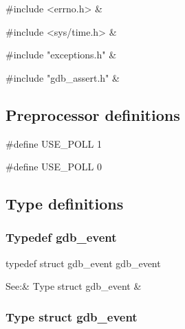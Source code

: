 \medskip
\begin{cxreftabi}
{\stt \#include <errno.h>} &\\
\end{cxreftabi}

\medskip
\begin{cxreftabi}
{\stt \#include <sys/time.h>} &\\
\end{cxreftabi}

\medskip
\begin{cxreftabi}
{\stt \#include "exceptions.h"} &\\
\end{cxreftabi}

\medskip
\begin{cxreftabi}
{\stt \#include "gdb\_assert.h"} &\\
\end{cxreftabi}


\subsection*{Preprocessor definitions}

{\stt \#define USE\_POLL 1}

\medskip
{\stt \#define USE\_POLL 0}


\subsection{Type definitions}


\subsubsection{Typedef gdb\_event}
\label{type_gdb_event_event-loop.c}

{\stt typedef struct gdb\_event gdb\_event}

\smallskip
\begin{cxreftabii}
See:& Type struct gdb\_event & \\
\end{cxreftabii}


\subsubsection{Type struct gdb\_event}
\label{type_struct_gdb_event_event-loop.c}

